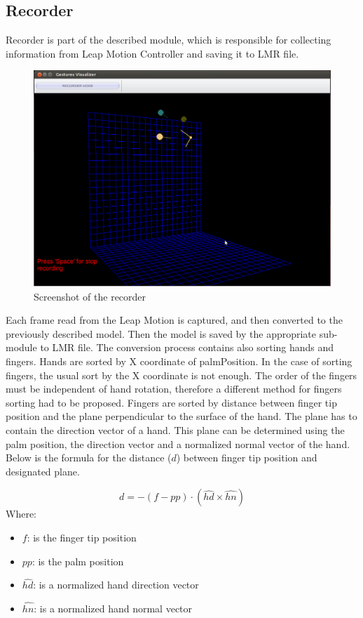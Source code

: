 \subsection{Recorder}
Recorder is part of the described module, which is responsible for collecting information from Leap Motion Controller and saving it to LMR file.

\begin{figure}[htb]
\centering
 \includegraphics[width=1\columnwidth]{figures/recorder.png}
 \caption{Screenshot of the recorder}
 \label{recorder}
\end{figure}

Each frame read from the Leap Motion is captured, and then converted to the previously described model. Then the model is saved by the appropriate sub-module to LMR file. The conversion process contains also sorting hands and fingers. Hands are sorted by X coordinate of palmPosition. In the case of sorting fingers, the usual sort by the X coordinate is not enough. The order of the fingers must be independent of hand rotation, therefore a different method for fingers sorting had to be proposed. Fingers are sorted by distance between finger tip position and the plane perpendicular to the surface of the hand. The plane has to contain the direction vector of a hand. This plane can be determined using the palm position, the direction vector and a normalized normal vector of the hand.
Below is the formula for the distance ($d$) between finger tip position and designated plane.

\[ d = -(f - pp) \cdot (\hat{hd} \times \hat{hn}) \]
Where:
\begin{itemize}
    \item[] $f$: is the finger tip position
    \item[] $pp$: is the palm position
    \item[] $\hat{hd}$: is a normalized hand direction vector
    \item[] $\hat{hn}$: is a normalized hand normal vector
\end{itemize}

